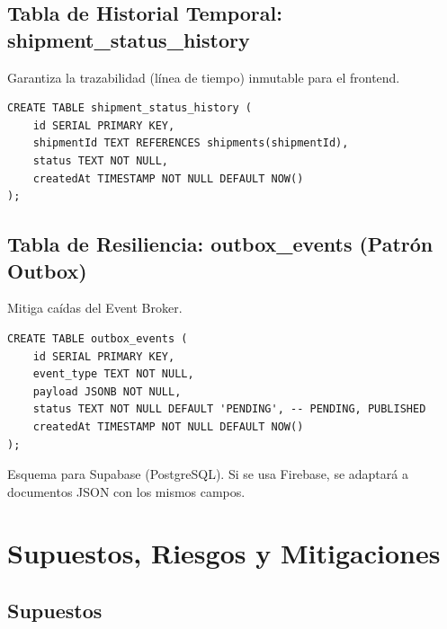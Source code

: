 \documentclass[11pt, a4paper]{article}
\begin{document}
\subsection{Tabla de Historial Temporal: shipment\_status\_history}
Garantiza la trazabilidad (línea de tiempo) inmutable para el frontend.

\begin{lstlisting}
CREATE TABLE shipment_status_history (
    id SERIAL PRIMARY KEY,
    shipmentId TEXT REFERENCES shipments(shipmentId),
    status TEXT NOT NULL,
    createdAt TIMESTAMP NOT NULL DEFAULT NOW()
);
\end{lstlisting}

\subsection{Tabla de Resiliencia: outbox\_events (Patrón Outbox)}
Mitiga caídas del Event Broker.

\begin{lstlisting}
CREATE TABLE outbox_events (
    id SERIAL PRIMARY KEY,
    event_type TEXT NOT NULL,
    payload JSONB NOT NULL,
    status TEXT NOT NULL DEFAULT 'PENDING', -- PENDING, PUBLISHED
    createdAt TIMESTAMP NOT NULL DEFAULT NOW()
);
\end{lstlisting}

\begin{infobox}
  Esquema para Supabase (PostgreSQL). Si se usa Firebase,
  se adaptará a documentos JSON con los mismos campos.
\end{infobox}


\section{Supuestos, Riesgos y Mitigaciones}

\subsection{Supuestos}
\end{document}
